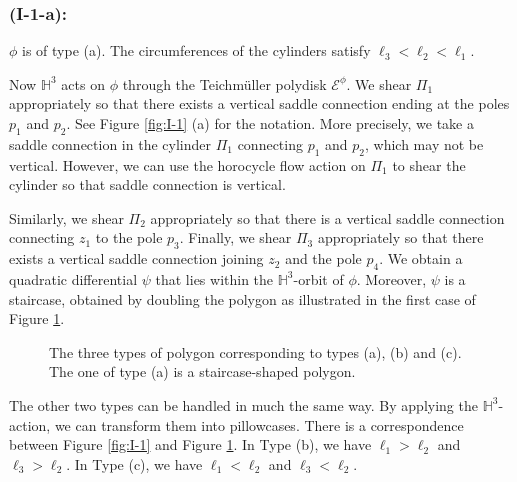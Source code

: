 \documentclass[11pt]{amsart}
\theoremstyle{plain}
\newcommand{\HP}{\mathbb{H}}
\begin{document}
\subsubsection*{\textbf{(I-1-a):}} $\phi$ is of type (a).  
The circumferences of the cylinders satisfy $\ell_3 < \ell_2 < \ell_1$.


Now $\HP^3$ acts on $\phi$ through the Teichm\"uller polydisk $\mathcal{E}^\phi$. 
We  shear $\Pi_1$   appropriately so that there exists a vertical saddle connection ending at the poles $p_1$ and $p_2$. See Figure \ref{fig:I-1} (a) for the notation. More precisely, 
we take a saddle connection in the cylinder $\Pi_1$ connecting $p_1$ and $p_2$, which may not be vertical. However, we can use the horocycle flow action on $\Pi_1$ to shear the cylinder so that 
saddle connection is vertical. 

Similarly, we shear $\Pi_2$ appropriately so that there is a vertical saddle connection connecting $z_1$ to the pole $p_3$. Finally, we shear $\Pi_3$ appropriately so that there exists a vertical saddle connection joining  $z_2$ and the pole $p_4$. 
We obtain a quadratic differential $\psi$ that lies within the $\HP^3$-orbit of $\phi$. Moreover, $\psi$  is a staircase, obtained by doubling the polygon as illustrated in the first case of Figure  \ref{fig:I-1-new}.


\begin{figure}[h]
    \centering


\caption{The three types of polygon corresponding to types (a),
(b) and (c). The one of type (a) is a staircase-shaped polygon.} 

\label{fig:I-1-new}
\end{figure}

The other two types can be  handled in much the same way. By applying
the $\mathbb{H}^3$-action, we can transform them into pillowcases. 
There is a correspondence between Figure  \ref{fig:I-1} and 
Figure  \ref{fig:I-1-new}.
In Type (b), we have $\ell_1 > \ell_2$ and $\ell_3>\ell_2$. 
In Type (c), we have $\ell_1 < \ell_2$ and $\ell_3< \ell_2$.  
\end{document}
